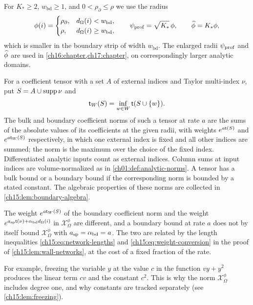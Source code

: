 \begin{definition}
For $K_*\ge2$, $w_{\mathrm{bd}}\ge1$, and $0<\rho_\partial\le\rho$ we use the radius
\[
 \phi(i)=\begin{cases}\rho_\partial,&d_\Omega(i)<w_{\mathrm{bd}},\\
                         \rho,&d_\Omega(i)\ge w_{\mathrm{bd}},\end{cases}
 \qquad \psi_{\mathrm{prof}}=\sqrt{K_*}\,\phi,
 \qquad\widehat\phi=K_*\phi,
\]
which is smaller in the boundary strip of width $w_{\mathrm{bd}}$. The enlarged radii $\psi_{\mathrm{prof}}$ and $\widehat\phi$ are used in \cref{ch16:chapter,ch17:chapter}, on correspondingly larger analytic domains.

For a coefficient tensor with a set $A$ of external indices and Taylor multi-index $\nu$, put $S=A\cup\operatorname{supp}\nu$ and
\[
 \mathsf t_W(S)=\inf_{w\in W}\mathsf t(S\cup\{w\}).
\]
The bulk and boundary coefficient norms of such a tensor at rate $a$ are the sums of the absolute values of its coefficients at the given radii, with weights $e^{a\mathsf t(S)}$ and $e^{a\mathsf t_W(S)}$ respectively, in which one external index is fixed and all other indices are summed; the norm is the maximum over the choice of the fixed index. Differentiated analytic inputs count as external indices. Column sums at input indices are volume-normalized as in \cref{ch01:def:analytic-norms}. A tensor has a bulk bound or a boundary bound if the corresponding norm is bounded by a stated constant. The algebraic properties of these norms are collected in \cref{ch15:lem:boundary-algebra}.
\end{definition}

\begin{remark}\label{ch15:rem:two-weights}
The weight $e^{a\mathsf t_W(S)}$ of the boundary coefficient norm and the weight $e^{a_{\mathrm{sp}}\mathsf t(\nu)+\alpha_{\mathrm{bd}} d_\Omega(i)}$ in $\mathcal X_\Omega^\phi$ are different, and a boundary bound at rate $a$ does not by itself bound $\mathcal X_\Omega^\phi$ with $a_{\mathrm{sp}}=\alpha_{\mathrm{bd}}=a$. The two are related by the length inequalities \eqref{ch15:eq:network-lengths} and \eqref{ch15:eq:weight-conversion} in the proof of \cref{ch15:lem:wall-networks}, at the cost of a fixed fraction of the rate.
\end{remark}

For example, freezing the variable $y$ at the value $c$ in the function $vy+y^2$ produces the linear term $cv$ and the constant $c^2$. This is why the norm $\mathcal X_\Omega^\phi$ includes degree one, and why constants are tracked separately (see \cref{ch15:lem:freezing}).

